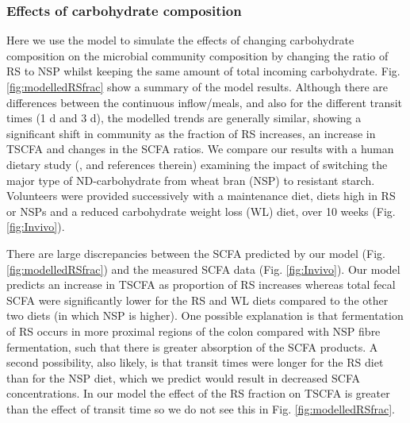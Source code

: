 \documentclass[a4paper]{article}
\begin{document}
\subsubsection*{Effects of carbohydrate composition}
Here we use the model to simulate the effects of changing carbohydrate composition on the microbial community composition by changing the ratio of RS to NSP whilst keeping the same amount of total incoming carbohydrate.
Fig. \ref{fig:modelledRSfrac} show a summary of the model results. 
Although there are differences between the continuous inflow/meals, and also for the different transit times (1 d and 3 d), the modelled trends are generally similar, showing a significant shift in community as the fraction of RS increases, an increase in TSCFA and changes in the SCFA ratios. 
We compare our results with a human dietary study (\cite{walker2011}, \cite{salonen} and references therein) examining the impact of switching the major type of ND-carbohydrate from wheat bran (NSP) to resistant starch.
Volunteers were provided successively with a maintenance diet, diets high in RS or NSPs and a reduced carbohydrate weight loss (WL) diet, over 10 weeks (Fig. \ref{fig:Invivo}).




There are large discrepancies between the SCFA predicted by our model (Fig. \ref{fig:modelledRSfrac}) and the measured SCFA data (Fig. \ref{fig:Invivo}). 
Our model predicts an increase in TSCFA as proportion of RS increases whereas total fecal SCFA were significantly lower for the RS and WL diets compared to the other two diets (in which NSP is higher). 
One possible explanation is that fermentation of RS occurs in more proximal regions of the colon compared with NSP fibre fermentation, such that there is greater absorption of the SCFA products.
A second possibility, also likely, is that transit times were longer for the RS diet than for the NSP diet, which we predict would result in decreased SCFA concentrations.%
In our model the effect of the RS fraction on TSCFA is greater than the effect of transit time so we do not see this in Fig. \ref{fig:modelledRSfrac}.
\end{document}
